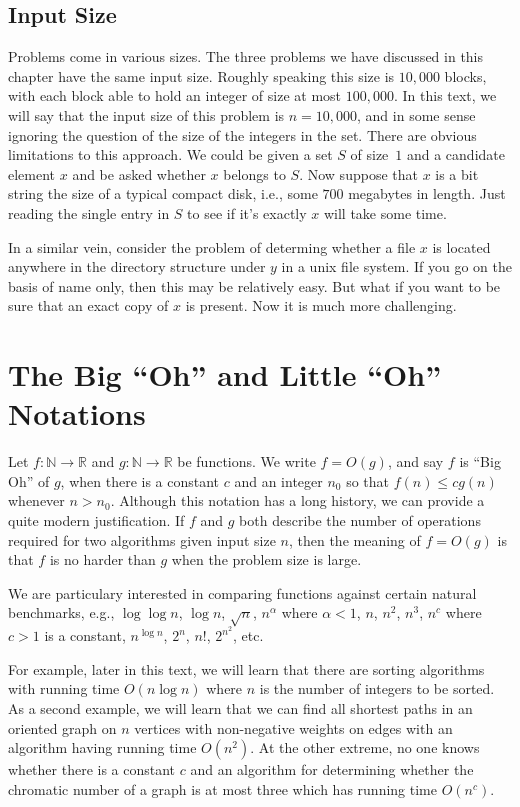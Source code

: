\subsection{Input Size}

Problems come in various sizes.  The three problems we have discussed
in this chapter have the same input size.   Roughly speaking this
size is $10,000$ blocks, with each block able to hold an integer
of size at most $100,000$.  In this text, we will say that the
input size of this problem is $n=10,000$, and in some sense ignoring
the question of the size of the integers in the set.  There are 
obvious limitations to this approach.  We could be given a set $S$
of size~$1$ and a candidate element $x$ and be asked whether $x$ belongs
to $S$.  Now suppose that $x$ is a bit string the size of a typical
compact disk, i.e., some $700$ megabytes in length.  Just reading the single
entry in $S$ to see if it's exactly $x$ will take some time.

In a similar vein, consider the problem of determing whether a file
$x$ is located anywhere in the directory structure under $y$ in
a unix file system.  If you go on the basis of name only, then
this may be relatively easy.  But what if you want to be sure that an exact copy
of $x$ is present.  Now it is much more challenging.

\section{The Big ``Oh'' and Little ``Oh'' Notations}\label{s:basics:big-oh}

Let $f:\mathbb{N}\longrightarrow \mathbb{R}$ and
$g:\mathbb{N}\longrightarrow\mathbb{R}$ be functions.
We write $f=O(g)$, and say $f$ is ``Big Oh'' of $g$,  
when there is a constant $c$ and an integer
$n_0$ so that $f(n)\le cg(n)$ whenever $n>n_0$.
Although this notation has a long history, we can provide
a quite modern justification.  If $f$ and $g$ both describe
the number of operations  required for two algorithms given input
size $n$, then the meaning of $f=O(g)$ is that $f$ is no
harder than $g$ when the problem size is large.

We are particulary interested in comparing functions against
certain natural benchmarks, e.g.,  $\log\log n$, $\log n$, $\sqrt{n}$, 
$n^\alpha$ where $\alpha<1$,  $n$, $n^2$, $n^3$, $n^c$ where $c>1$ 
is a constant, $n^{\log n}$, $2^n$, $n!$, $2^{n^2}$, etc.

For example, later in this text, we will learn that there
are sorting algorithms with running time $O(n\log n)$ where
$n$ is the number of integers to be sorted.  As a second 
example, we will learn that we can find all shortest paths in 
an oriented graph on $n$ vertices with non-negative weights on edges with an 
algorithm having running time $O(n^2)$.  At the other extreme,
no one knows whether there is a constant $c$ and an algorithm for 
determining whether the chromatic number of a graph is at most three
which has running time $O(n^c)$.  


